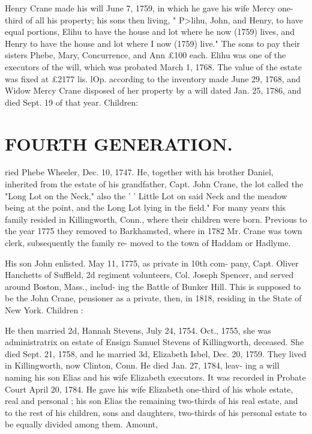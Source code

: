 \documentclass[oneside]{book}
\begin{document}
Henry Crane made his will June 7, 1759, in which he gave his 
wife Mercy one-third of all his property; his sons then living, 
" P>lihu, John, and Henry, to have equal portions, Elihu to have 
the house and lot where he now (1759) lives, and Henry to have 
the house and lot where I now (1759) live." The sons to pay 
their sisters Phebe, Mary, Concurrence, and Ann £100 each. 
Elihu was one of the executors of the will, which was probated 
March 1, 1768. The value of the estate was fixed at £2177  
lis.  lOp. according to the inventory made June 29, 1768, and 
Widow Mercy Crane disposed of her property by a will dated 
Jan. 25, 1786, and died Sept. 19 of that year. Children: 












\section{FOURTH GENERATION.}


ried Phebe Wheeler, Dec. 10, 1747. He, together with his brother 
Daniel, inherited from the estate of his grandfather, Capt. John 
Crane, the lot called the "Long Lot on the Neck," also the 
' ' Little Lot on said Neck and the meadow being at the point, and 
the Long Lot lying in the field." For many years this family 
resided in Killingworth, Conn., where their children were born. 
Previous to the year 1775 they removed to Barkhamsted, where 
in 1782 Mr. Crane was town clerk, subsequently the family re- 
moved to the town of Haddam or Hadlyme. 

His son John enlisted. May 11, 1775, as private in 10th com- 
pany, Capt. Oliver Hanchetts of Suffleld, 2d regiment volunteers, 
Col. Joseph Spencer, and served around Boston, Mass., includ- 
ing the Battle of Bunker Hill. This is supposed to be the John 
Crane, pensioner as a private, then, in 1818, residing in the State 
of New York. Children : 








He then married 2d, Hannah Stevens, July 24, 1754. Oct., 
1755, she was administratrix on estate of Ensign Samuel Stevens 
of Killingworth, deceased. She died Sept. 21, 1758, and he 
married 3d, Elizabeth Isbel, Dec. 20, 1759. They lived in 
Killingworth, now Clinton, Conn. He died Jan. 27, 1784, leav- 
ing a will naming his son Elias and his wife Elizabeth executors. 
It was recorded in Probate Court April 20, 1784. He gave his 
wife Elizabeth one-third of his whole estate, real and personal ; 
his son Elias the remaining two-thirds of his real estate, and to 
the rest of his children, sons and daughters, two-thirds of his 
personal estate to be equally divided among them. Amount, 
\end{document}
